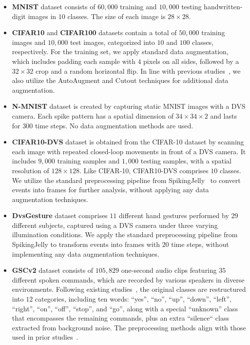 \begin{itemize}
    \item \textbf{MNIST} dataset consists of $60,\!000$ training and $10,\!000$ testing handwritten-digit images in $10$ classes. The size of each image is $28\times28$.
    \item \textbf{CIFAR10} and \textbf{CIFAR100} datasets contain a total of $50,\!000$ training images and $10,\!000$ test images, categorized into $10$ and $100$ classes, respectively. For the training set, we apply standard data augmentation, which includes padding each sample with $4$ pixels on all sides, followed by a $32\times32$ crop and a random horizontal flip. In line with previous studies~\cite{ASGL}, we also utilize the AutoAugment and Cutout techniques for additional data augmentation.
    \item \textbf{N-MNIST} dataset is created by capturing static MNIST images with a DVS camera. Each spike pattern has a spatial dimension of $34\times34\times2$ and lasts for $300$ time steps. No data augmentation methods are used.
    \item \textbf{CIFAR10-DVS} dataset is obtained from the CIFAR-10 dataset by scanning each image with repeated closed-loop movements in front of a DVS camera. It includes $9,\!000$ training samples and $1,\!000$ testing samples, with a spatial resolution of $128\times128$. Like CIFAR-10, CIFAR10-DVS comprises $10$ classes. We utilize the standard preprocessing pipeline from SpikingJelly~\cite{2023spikingjelly} to convert events into frames for further analysis, without applying any data augmentation techniques.
    \item \textbf{DvsGesture} dataset comprises $11$ different hand gestures performed by $29$ different subjects, captured using a DVS camera under three varying illumination conditions. We apply the standard preprocessing pipeline from SpikingJelly to transform events into frames with $20$ time steps, without implementing any data augmentation techniques.
    \item \textbf{GSCv2} dataset consists of $105,\!829$ one-second audio clips featuring $35$ different spoken commands, which are recorded by various speakers in diverse environments. Following existing studies~\cite{TCLIF,ALIF}, the original classes are restructured into $12$ categories, including ten words: ``yes'', ``no'', ``up'', ``down'', ``left'', ``right'', ``on'', ``off'', ``stop'', and ``go'', along with a special ``unknown'' class that encompasses the remaining commands, plus an extra ``silence`` class extracted from background noise. The preprocessing methods align with those used in prior studies~\cite{TCLIF,ALIF}.

\end{itemize}
